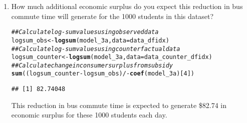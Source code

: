 \documentclass[11pt,letterpaper]{article}\usepackage[]{graphicx}\usepackage[]{color}
\makeatletter
\newcommand{\hlnum}[1]{\textcolor[rgb]{0.686,0.059,0.569}{#1}}%
\newcommand{\hlcom}[1]{\textcolor[rgb]{0.678,0.584,0.686}{\textit{#1}}}%
\newcommand{\hlopt}[1]{\textcolor[rgb]{0,0,0}{#1}}%
\newcommand{\hlstd}[1]{\textcolor[rgb]{0.345,0.345,0.345}{#1}}%
\newcommand{\hlkwb}[1]{\textcolor[rgb]{0.69,0.353,0.396}{#1}}%
\newcommand{\hlkwc}[1]{\textcolor[rgb]{0.333,0.667,0.333}{#1}}%
\newcommand{\hlkwd}[1]{\textcolor[rgb]{0.737,0.353,0.396}{\textbf{#1}}}%
\newenvironment{kframe}{%
 \def\at@end@of@kframe{}%
 \ifinner\ifhmode%
  \def\at@end@of@kframe{\end{minipage}}%
  \begin{minipage}{\columnwidth}%
 \fi\fi%
 \def\FrameCommand##1{\hskip\@totalleftmargin \hskip-\fboxsep
 \colorbox{shadecolor}{##1}\hskip-\fboxsep
     \hskip-\linewidth \hskip-\@totalleftmargin \hskip\columnwidth}%
 \MakeFramed {\advance\hsize-\width
   \@totalleftmargin\z@ \linewidth\hsize
   \@setminipage}}%
 {\par\unskip\endMakeFramed%
 \at@end@of@kframe}
\newenvironment{knitrout}{}{} %
\makeatother
\begin{document}
\begin{enumerate}[label=\alph*., leftmargin=*]
\begin{enumerate}[label=\roman*.]
		\item How much additional economic surplus do you expect this reduction in bus commute time will generate for the 1000 students in this dataset?

\begin{knitrout}
\color{fgcolor}\begin{kframe}
\begin{alltt}
\hlcom{## Calculate log-sum values using observed data}
\hlstd{logsum_obs} \hlkwb{<-} \hlkwd{logsum}\hlstd{(model_3a,} \hlkwc{data} \hlstd{= data_dfidx)}
\hlcom{## Calculate log-sum values using counterfactual data}
\hlstd{logsum_counter} \hlkwb{<-} \hlkwd{logsum}\hlstd{(model_3a,} \hlkwc{data} \hlstd{= data_counter_dfidx)}
\hlcom{## Calculate change in consumer surplus from subsidy}
\hlkwd{sum}\hlstd{((logsum_counter} \hlopt{-} \hlstd{logsum_obs)} \hlopt{/ -}\hlkwd{coef}\hlstd{(model_3a)[}\hlnum{4}\hlstd{])}
\end{alltt}
\begin{verbatim}
## [1] 82.74048
\end{verbatim}
\end{kframe}
\end{knitrout}

		This reduction in bus commute time is expected to generate \$82.74 in economic surplus for these 1000 students each day.
	\end{enumerate}

\end{enumerate}
\end{document}
